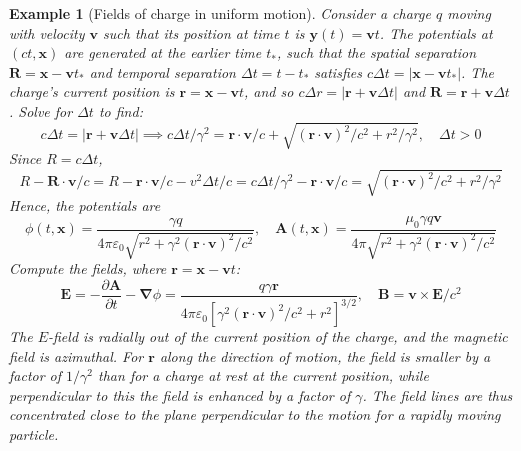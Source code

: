 \documentclass[a4paper]{article}
\newtheorem{eg}{Example}[section]
\theoremstyle{new}
\begin{document}
\begin{eg}[Fields of charge in uniform motion]
Consider a charge $q$ moving with velocity $\mathbf{v}$ such that its position at time $t$ is $\mathbf{y}(t)=\mathbf{v}t$. The potentials at $(ct,\mathbf{x})$ are generated at the earlier time $t_*$, such that the spatial separation $\mathbf{R}=\mathbf{x}-\mathbf{v}t_*$ and temporal separation $\Delta t=t-t_*$ satisfies $c\Delta t=|\mathbf{x}-\mathbf{v}t_*|$. The charge's current position is $\mathbf{r}=\mathbf{x}-\mathbf{v}t$, and so $c\Delta r=|\mathbf{r}+\mathbf{v}\Delta t|$ and $\mathbf{R}=\mathbf{r}+\mathbf{v}\Delta t$. Solve for $\Delta t$ to find:
$$c\Delta t=|\mathbf{r}+\mathbf{v}\Delta t|\implies c\Delta t/\gamma^2=\mathbf{r}\cdot\mathbf{v}/c+\sqrt{(\mathbf{r}\cdot\mathbf{v})^2/c^2+r^2/\gamma^2},\quad\Delta t>0$$
Since $R=c\Delta t$,
$$R-\mathbf{R}\cdot\mathbf{v}/c=R-\mathbf{r}\cdot\mathbf{v}/c-v^2\Delta t/c=c\Delta t/\gamma^2-\mathbf{r}\cdot\mathbf{v}/c=\sqrt{(\mathbf{r}\cdot\mathbf{v})^2/c^2+r^2/\gamma^2}$$
Hence, the potentials are
$$\phi(t,\mathbf{x})=\frac{\gamma q}{4\pi\varepsilon_0\sqrt{r^2+\gamma^2(\mathbf{r}\cdot\mathbf{v})^2/c^2}},\quad\mathbf{A}(t,\mathbf{x})=\frac{\mu_0\gamma q\mathbf{v}}{4\pi\sqrt{r^2+\gamma^2(\mathbf{r}\cdot\mathbf{v})^2/c^2}}$$
Compute the fields, where $\mathbf{r}=\mathbf{x}-\mathbf{v}t$:
$$\mathbf{E}=-\frac{\partial\mathbf{A}}{\partial t}-\boldsymbol{\nabla}\phi=\frac{q\gamma\mathbf{r}}{4\pi\varepsilon_0[\gamma^2(\mathbf{r}\cdot\mathbf{v})^2/c^2+r^2]^{3/2}},\quad\mathbf{B}=\mathbf{v}\times\mathbf{E}/c^2$$
The $E$-field is radially out of the current position of the charge, and the magnetic field is azimuthal. For $\mathbf{r}$ along the direction of motion, the field is smaller by a factor of $1/\gamma^2$ than for a charge at rest at the current position, while perpendicular to this the field is enhanced by a factor of $\gamma$. The field lines are thus concentrated close to the plane perpendicular to the motion for a rapidly moving particle.
\end{eg}
\end{document}
